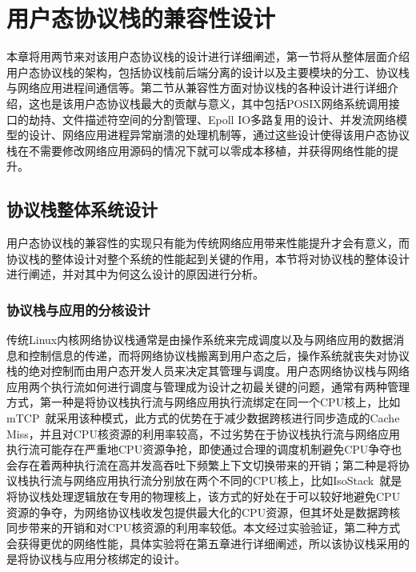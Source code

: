 \chapter{用户态协议栈的兼容性设计}

本章将用两节来对该用户态协议栈的设计进行详细阐述，第一节将从整体层面介绍用户态协议栈的架构，包括协议栈前后端分离的设计以及主要模块的分工、协议栈与网络应用进程间通信等。第二节从兼容性方面对协议栈的各种设计进行详细介绍，这也是该用户态协议栈最大的贡献与意义，其中包括POSIX网络系统调用接口的劫持、文件描述符空间的分割管理、Epoll IO多路复用的设计、并发流网络模型的设计、网络应用进程异常崩溃的处理机制等，通过这些设计使得该用户态协议栈在不需要修改网络应用源码的情况下就可以零成本移植，并获得网络性能的提升。

\section{协议栈整体系统设计}

用户态协议栈的兼容性的实现只有能为传统网络应用带来性能提升才会有意义，而协议栈的整体设计对整个系统的性能起到关键的作用，本节将对协议栈的整体设计进行阐述，并对其中为何这么设计的原因进行分析。

\subsection{协议栈与应用的分核设计}

传统Linux内核网络协议栈通常是由操作系统来完成调度以及与网络应用的数据消息和控制信息的传递，而将网络协议栈搬离到用户态之后，操作系统就丧失对协议栈的绝对控制而由用户态开发人员来决定其管理与调度。用户态网络协议栈与网络应用两个执行流如何进行调度与管理成为设计之初最关键的问题，通常有两种管理方式，第一种是将协议栈执行流与网络应用执行流绑定在同一个CPU核上，比如mTCP~\cite{mTCP}就采用该种模式，此方式的优势在于减少数据跨核进行同步造成的Cache Miss，并且对CPU核资源的利用率较高，不过劣势在于协议栈执行流与网络应用执行流可能存在严重地CPU资源争抢，即使通过合理的调度机制避免CPU争夺也会存在着两种执行流在高并发高吞吐下频繁上下文切换带来的开销；第二种是将协议栈执行流与网络应用执行流分别放在两个不同的CPU核上，比如IsoStack~\cite{IsoStack}就是将协议栈处理逻辑放在专用的物理核上，该方式的好处在于可以较好地避免CPU资源的争夺，为网络协议栈收发包提供最大化的CPU资源，但其坏处是数据跨核同步带来的开销和对CPU核资源的利用率较低。本文经过实验验证，第二种方式会获得更优的网络性能，具体实验将在第五章进行详细阐述，所以该协议栈采用的是将协议栈与应用分核绑定的设计。

